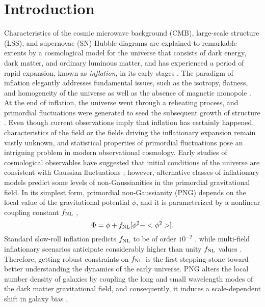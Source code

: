 \section{Introduction}
\label{sec:introduction}
Characteristics of the cosmic microwave background (CMB), large-scale structure (LSS), and supernovae (SN) Hubble diagrams are explained to remarkable extents by a cosmological model for the universe that consists of dark energy, dark matter, and ordinary luminous matter, and has experienced a period of rapid expansion, known as \textit{inflation}, in its early stages \citep[see, e.g.,][]{weinberg2013observational}. The paradigm of inflation elegantly addresses fundamental issues, such as the isotropy, flatness, and homogeneity of the universe as well as the absence of magnetic monopole \citep[see, e.g.,][]{weinberg2008cosmology}. At the end of inflation, the universe went through a reheating process, and primordial fluctuations were generated to seed the subsequent growth of structure \citep{kofman1994reheating, bassett2006inflation, lyth2009primordial}. Even though current observations imply that inflation has certainly happened, characteristics of the field or the fields driving the inflationary expansion remain vastly unknown, and statistical properties of primordial fluctuations pose an intriguing problem in modern observational cosmology. Early studies of cosmological observables have suggested that initial conditions of the universe are consistent with Gaussian fluctuations \citep{PhysRevD.69.103501, guth2005inflationary}; however, alternative classes of inflationary models predict some levels of non-Gaussianities in the primordial gravitational field. In its simplest form, primordial non-Gaussianity (PNG) depends on the local value of the gravitational potential $\phi$, and it is parameterized by a nonlinear coupling constant $f_{\rm NL}$ \citep{komatsu2001acoustic},
\begin{equation}
 \Phi = \phi + f_{\rm NL} [\phi^{2} - <\phi^{2}>].
\end{equation}
Standard slow-roll inflation predicts $f_{\rm NL}$ to be of order $10^{-2}$ \citep[see, e.g.,][for a review]{alvarez2014arXiv1412.4671A}, while multi-field inflationary scenarios anticipate considerably higher than unity $f_{\rm NL}$ values \citep[see, e.g.,][]{de2017next}. Therefore, getting robust constraints on $f_{\rm NL}$ is the first stepping stone toward better understanding the dynamics of the early universe. PNG alters the local number density of galaxies by coupling the long and small wavelength modes of the dark matter gravitational field, and consequently, it induces a scale-dependent shift in galaxy bias \citep[see, e.g.,][]{dalal2008imprints, slosar2008constraints},
